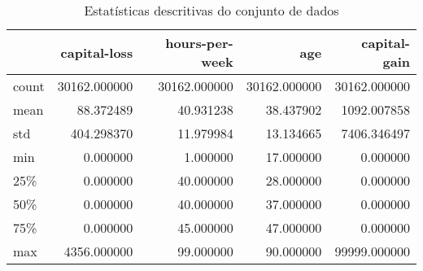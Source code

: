 \begin{table}
\centering
\caption{Estatísticas descritivas do conjunto de dados}
\label{tbl:descriptive_statistics}
\begin{tabular}{lrrrr}
\toprule
{} &  capital-loss &  hours-per-week &           age &  capital-gain \\
\midrule
count &  30162.000000 &    30162.000000 &  30162.000000 &  30162.000000 \\
mean  &     88.372489 &       40.931238 &     38.437902 &   1092.007858 \\
std   &    404.298370 &       11.979984 &     13.134665 &   7406.346497 \\
min   &      0.000000 &        1.000000 &     17.000000 &      0.000000 \\
25\%   &      0.000000 &       40.000000 &     28.000000 &      0.000000 \\
50\%   &      0.000000 &       40.000000 &     37.000000 &      0.000000 \\
75\%   &      0.000000 &       45.000000 &     47.000000 &      0.000000 \\
max   &   4356.000000 &       99.000000 &     90.000000 &  99999.000000 \\
\bottomrule
\end{tabular}
\end{table}
